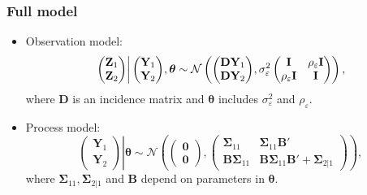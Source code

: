 \documentclass{beamer}
\newcommand{\Bmat} {\textbf{B}}
\newcommand{\Dmat} {\textbf{D}}
\newcommand{\Imat} {\textbf{I}}
\newcommand{\Yvec}{\mathbf{Y}}
\newcommand{\Zvec}{\mathbf{Z}}
\newcommand{\thetab}{\boldsymbol{\theta}}
\newcommand{\bzero}{\boldsymbol{0}}
\newcommand{\bSigma}{\bm{\Sigma}}
\begin{document}
\begin{frame}
\frametitle{Full model}

\begin{itemize}
\item Observation model:
\begin{align*}
\left.\begin{pmatrix} \Zvec_1 \\ \Zvec_2 \end{pmatrix}
\right|
\begin{pmatrix} \Yvec_1 \\ \Yvec_2 \end{pmatrix} \hspace{-0.02in} ,\thetab
\sim
\mathcal{N}\left(
\begin{pmatrix} \Dmat\Yvec_1 \\ \Dmat\Yvec_2 \end{pmatrix}  \hspace{-0.02in}, \sigma^2_\varepsilon\begin{pmatrix} \Imat & \rho_\varepsilon\Imat \\ \rho_\varepsilon\Imat & \Imat \end{pmatrix}
\right),
\end{align*}
where $\Dmat$ is an incidence matrix and $\thetab$ includes $\sigma^2_\varepsilon$ and $\rho_\varepsilon$.
\item Process model:
\begin{equation*}
\left.\begin{pmatrix} \Yvec_1 \\ \Yvec_2 \end{pmatrix}\right| \thetab \sim \mathcal{N}
\left(
\begin{pmatrix} \bzero \\ \bzero \end{pmatrix},
\begin{pmatrix}
\bSigma_{11} & \bSigma_{11}\Bmat' \\
\Bmat \bSigma_{11} & \Bmat \bSigma_{11}\Bmat' + \bSigma_{2|1}
\end{pmatrix}
\right),
\end{equation*}
\noindent where $\bSigma_{11}, \bSigma_{2|1}$ and $\Bmat$ depend on parameters in $\thetab$.
\end{itemize}
\end{frame}

\end{document}
